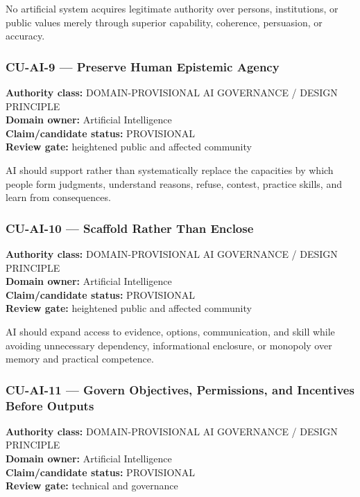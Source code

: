 \documentclass[
  11pt,
]{article}
\begin{document}
No artificial system acquires legitimate authority over persons,
institutions, or public values merely through superior capability,
coherence, persuasion, or accuracy.

\subsubsection{CU-AI-9 --- Preserve Human Epistemic
Agency}\label{cu-ai-9-preserve-human-epistemic-agency}

\textbf{Authority class:} DOMAIN-PROVISIONAL AI GOVERNANCE / DESIGN
PRINCIPLE\\
\textbf{Domain owner:} Artificial Intelligence\\
\textbf{Claim/candidate status:} PROVISIONAL\\
\textbf{Review gate:} heightened public and affected community

AI should support rather than systematically replace the capacities by
which people form judgments, understand reasons, refuse, contest,
practice skills, and learn from consequences.

\subsubsection{CU-AI-10 --- Scaffold Rather Than
Enclose}\label{cu-ai-10-scaffold-rather-than-enclose}

\textbf{Authority class:} DOMAIN-PROVISIONAL AI GOVERNANCE / DESIGN
PRINCIPLE\\
\textbf{Domain owner:} Artificial Intelligence\\
\textbf{Claim/candidate status:} PROVISIONAL\\
\textbf{Review gate:} heightened public and affected community

AI should expand access to evidence, options, communication, and skill
while avoiding unnecessary dependency, informational enclosure, or
monopoly over memory and practical competence.

\subsubsection{CU-AI-11 --- Govern Objectives, Permissions, and
Incentives Before
Outputs}\label{cu-ai-11-govern-objectives-permissions-and-incentives-before-outputs}

\textbf{Authority class:} DOMAIN-PROVISIONAL AI GOVERNANCE / DESIGN
PRINCIPLE\\
\textbf{Domain owner:} Artificial Intelligence\\
\textbf{Claim/candidate status:} PROVISIONAL\\
\textbf{Review gate:} technical and governance
\end{document}
